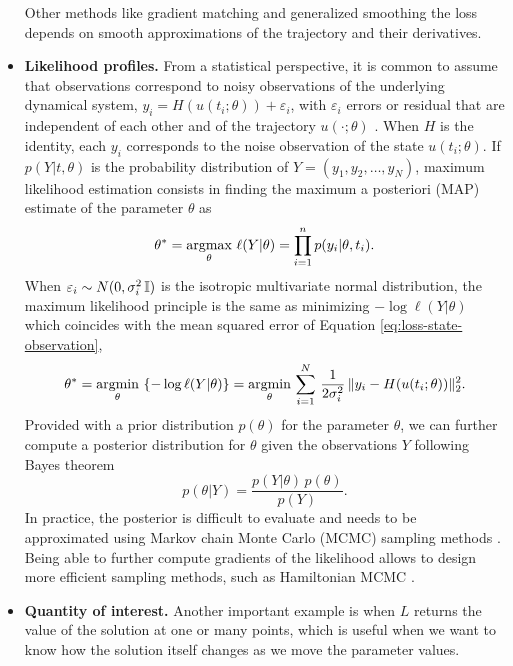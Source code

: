 \begin{itemize}
    Other methods like gradient matching and generalized smoothing the loss depends on smooth approximations of the trajectory and their derivatives. 
    \item \textbf{Likelihood profiles.} From a statistical perspective, it is common to assume that observations correspond to noisy observations of the underlying dynamical system, $y_i = H(u(t_i; \theta)) + \varepsilon_i$, with $\varepsilon_i$ errors or residual that are independent of each other and of the trajectory $u(\cdot ; \theta)$ \cite{ramsay2017dynamic}.
    When $H$ is the identity, each $y_i$ corresponds to the noise observation of the state $u(t_i; \theta)$.
    If $p(Y | t , \theta)$ is the probability distribution of $Y=(y_1, y_2, \ldots, y_N)$, maximum likelihood estimation consists in finding the maximum a posteriori (MAP) estimate of the parameter $\theta$ as
    \begin{equation}
        \theta^* 
        = 
        \underset{\theta}{\text{argmax}} \,\, \ell (Y | \theta) 
        = 
        \prod_{i=1}^n p(y_i | \theta, t_i) .
    \end{equation}
    When $\varepsilon_i \sim N(0, \sigma_i^2 \operatorname{\mathbb{I}})$ is the isotropic multivariate normal distribution, the maximum likelihood principle is the same as minimizing $- \log \ell(Y | \theta)$ which coincides with the mean squared error of Equation \eqref{eq:loss-state-observation},
    \begin{equation}
        \theta^* 
        = 
        \underset{\theta}{\text{argmin}} \, \left \{ - \log \ell (Y | \theta) \right \}
        = 
        \underset{\theta}{\text{argmin}} \, \sum_{i=1}^N 
        \, \frac{1}{2\sigma_i^2} \,
        \| y_i - H(u(t_i; \theta)) \|_2^2 .
    \end{equation}
    Provided with a prior distribution $p(\theta)$ for the parameter $\theta$, we can further compute a posterior distribution for $\theta$ given the observations $Y$ following Bayes theorem 
    \begin{equation}
        p(\theta | Y) = \frac{p(Y | \theta) \, p (\theta)}{p(Y)}. 
    \end{equation}
    In practice, the posterior is difficult to evaluate and needs to be approximated using Markov chain Monte Carlo (MCMC) sampling methods \cite{gelman2013bayesian}. Being able to further compute gradients of the likelihood allows to design more efficient sampling methods, such as Hamiltonian MCMC \cite{Betancourt_2017}.
    \item \textbf{Quantity of interest.} Another important example is when $L$ returns the value of the solution at one or many points, which is useful when we want to know how the solution itself changes as we move the parameter values. 

\end{itemize}
